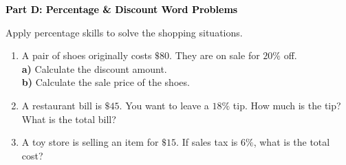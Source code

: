 \documentclass[12pt, letterpaper, fleqn]{article}
\newcommand{\blanklong}{\underline{\hspace{6.5cm}}}
\begin{document}
\newpage

\begin{tcolorbox}[colback=black!10]
    \large\textcolor{black}{\textbf{Part D: Percentage \& Discount Word Problems}}
\end{tcolorbox}

\vspace{3mm}

\noindent
Apply percentage skills to solve the shopping situations.

\vspace{5mm}

\begin{enumerate}[itemsep=2.5cm, leftmargin=0.6cm]
\item A pair of shoes originally costs $\$80$. They are on sale for $20\%$ off. \\
\textbf{a)} Calculate the discount amount. \blanklong \\
\textbf{b)} Calculate the sale price of the shoes. \blanklong

\item A restaurant bill is $\$45$. You want to leave a $18\%$ tip. How much is the tip? What is the total bill?
\vspace{1cm}

\item A toy store is selling an item for $\$15$. If sales tax is $6\%$, what is the total cost?
\end{enumerate}
\end{document}
